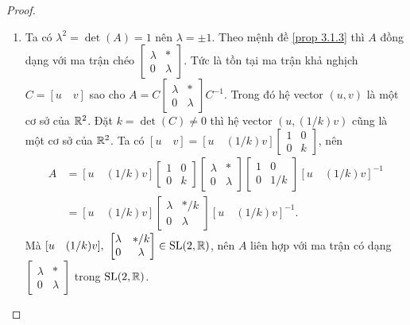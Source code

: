 \begin{proof}
    \begin{enumerate}
        \item Ta có $\lambda ^2 = \det(A) = 1$ nên $\lambda = \pm 1$. Theo mệnh đề \ref{prop 3.1.3} thì $A$ đồng dạng với ma trận chéo $\begin{bmatrix}
            \lambda & *\\
            0 & \lambda
        \end{bmatrix}$.
        Tức là tồn tại ma trận khả nghịch $C =[u\quad v]$ sao cho $A = C\begin{bmatrix}
            \lambda & *\\
            0 & \lambda
        \end{bmatrix}C^{-1}$. 
        Trong đó hệ vector $(u,v)$ là một cơ sở của $\mathbb{R}^2$. Đặt $k = \det(C) \neq 0$ thì hệ vector $(u,(1/k)v)$ cũng là một cơ sở của $\mathbb{R}^2$. Ta có $[u \quad v] = [u \quad (1/k)v] \begin{bmatrix}
        1 & 0\\
        0 & k
        \end{bmatrix}$, nên
        \begin{align*}
            A &= [u \quad (1/k)v] \begin{bmatrix}
        1 & 0\\
        0 & k
        \end{bmatrix}
        \begin{bmatrix}
            \lambda & *\\
            0 & \lambda
        \end{bmatrix}\begin{bmatrix}
        1 & 0\\
        0 & 1/k
        \end{bmatrix}[u \quad (1/k)v]^{-1}\\
        &= [u \quad (1/k)v]\begin{bmatrix}
            \lambda & */k\\
            0 & \lambda
        \end{bmatrix}[u \quad (1/k)v]^{-1}.
    \end{align*}
        Mà $[u\quad (1/k)v],~
        \begin{bmatrix}
            \lambda & */k\\
            0 & \lambda
            \end{bmatrix} \in \operatorname{SL}(2,\mathbb{R})$, nên $A$ liên hợp với ma trận có dạng $\begin{bmatrix}
            \lambda & *\\
            0 & \lambda
            \end{bmatrix}$ trong $\operatorname{SL}(2,\mathbb{R})$. 
        

\end{enumerate}
\end{proof}
